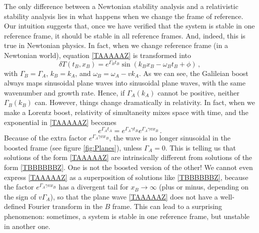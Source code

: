 \documentclass[a4paper, amsfonts, amssymb, amsmath, reprint, showkeys,  twoside, onecolumn,notitlepage,nofootinbib]{revtex4-1}
\theoremstyle{definition}
\theoremstyle{theorem}
\begin{document}
The only difference between a Newtonian stability analysis and a relativistic stability analysis lies in what happens when we change the frame of reference. Our intuition suggests that, once we have verified that the system is stable in one reference frame, it should be stable in all reference frames. And, indeed, this is true in Newtonian physics. In fact, when we change reference frame (in a Newtonian world), equation \eqref{TAAAAAZ} is transformed into
\begin{equation}\label{TBBBBBBZ}
\delta T (t_B , x_B) = e^{\Gamma_B t_B} \sin(k_B x_B -\omega_B t_B +\phi) \, ,
\end{equation}
with $\Gamma_B=\Gamma_A$, $k_B=k_A$, and $\omega_B=\omega_A-vk_A$. As we can see, the Galileian boost always maps sinusoidal plane waves into sinusoidal plane waves, with the same wavenumber and growth rate. Hence, if $\Gamma_A(k_A)$ cannot be positive, neither $\Gamma_B(k_B)$ can. However, things change dramatically in relativity. In fact, when we make a Lorentz boost, relativity of simultaneity mixes space with time, and the exponential in \eqref{TAAAAAZ} becomes
\begin{equation}\label{gammafavtfp}
e^{\Gamma_A t_A} = e^{\Gamma_A \gamma t_B} e^{\Gamma_A \gamma v x_B} \, .
\end{equation}
Because of the extra factor $e^{\Gamma_A \gamma v x_B}$, the wave is no longer sinusoidal in the boosted frame (see figure \ref{fig:Planes}), unless $\Gamma_A=0$. This is telling us that solutions of the form \eqref{TAAAAAZ} are intrinsically different from solutions of the form \eqref{TBBBBBBZ}. One is not the boosted version of the other! We cannot even express \eqref{TAAAAAZ}  as a superposition of solutions like \eqref{TBBBBBBZ}, because the factor $e^{\Gamma_A \gamma v x_B}$ has a divergent tail for $x_B \rightarrow \infty$ (plus or minus, depending on the sign of $v\Gamma_A$), so that the plane wave \eqref{TAAAAAZ} does not have a well-defined Fourier transform in the $B$ frame. This can lead to a surprising phenomenon: sometimes, a system is stable in one reference frame, but unstable in another one.










\end{document}
